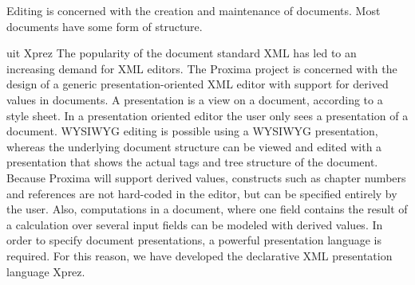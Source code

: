 




%								
%								
%								


\bc
Editing is concerned with the creation and maintenance of documents.  
Most documents have some form of structure. 
\ec

\bc uit Xprez
The popularity of the document standard XML has led to an increasing demand for XML editors. The Proxima project is concerned with the design of a generic presentation-oriented XML editor with support for derived values in documents. A presentation is a view on a document, according to a style sheet. In a presentation oriented editor the user only sees a presentation of a document. WYSIWYG editing is possible using a WYSIWYG presentation, whereas the underlying document structure can be viewed and edited with a presentation that shows the actual tags and tree structure of the document. Because Proxima will support derived values, constructs such as chapter numbers and references are not hard-coded in the editor, but can be specified entirely by the user. Also, computations in a document, where one field contains the result of a calculation over several input fields can be modeled with derived values. In order to specify document presentations, a powerful presentation language is required. For this reason, we have developed the declarative XML presentation language {\sc Xprez}.
\ec




%
%
%
%
%



